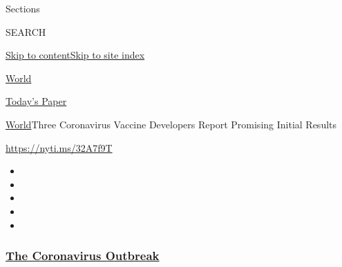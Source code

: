 Sections

SEARCH

\protect\hyperlink{site-content}{Skip to
content}\protect\hyperlink{site-index}{Skip to site index}

\href{https://www.nytimes3xbfgragh.onion/section/world}{World}

\href{https://myaccount.nytimes3xbfgragh.onion/auth/login?response_type=cookie\&client_id=vi}{}

\href{https://www.nytimes3xbfgragh.onion/section/todayspaper}{Today's
Paper}

\href{/section/world}{World}\textbar{}Three Coronavirus Vaccine
Developers Report Promising Initial Results

\url{https://nyti.ms/32A7f9T}

\begin{itemize}
\item
\item
\item
\item
\item
\end{itemize}

\hypertarget{the-coronavirus-outbreak}{%
\subsubsection{\texorpdfstring{\href{https://www.nytimes3xbfgragh.onion/news-event/coronavirus?name=styln-coronavirus-national\&region=TOP_BANNER\&block=storyline_menu_recirc\&action=click\&pgtype=Article\&impression_id=8258bab0-efba-11ea-91a0-1f980cab72d5\&variant=undefined}{The
Coronavirus
Outbreak}}{The Coronavirus Outbreak}}\label{the-coronavirus-outbreak}}

